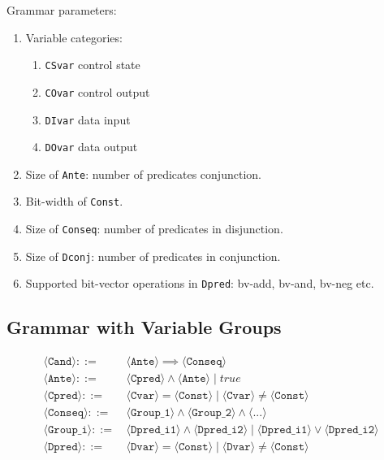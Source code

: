 \documentclass[10pt,conference]{article}
\numberwithin{equation}{section}
\newcommand{\tuple}[1]{\langle #1 \rangle}
\begin{document}
Grammar parameters:

\begin{enumerate}
\item Variable categories:
  \begin{enumerate}
    \item \texttt{CSvar} control state
    \item \texttt{COvar} control output
    \item \texttt{DIvar} data input
    \item \texttt{DOvar} data output
  \end{enumerate}
\item Size of \texttt{Ante}: number of predicates conjunction.
\item Bit-width of \texttt{Const}.
\item Size of \texttt{Conseq}: number of predicates in disjunction.
\item Size of \texttt{Dconj}: number of predicates in conjunction.
\item Supported bit-vector operations in \texttt{Dpred}: bv-add, bv-and, bv-neg etc.
\end{enumerate}



\subsection{Grammar with Variable Groups}

\begin{align}
\tuple{\texttt{Cand}} ::=\, & \tuple{\texttt{Ante}} \implies \tuple{\texttt{Conseq}} \\
\tuple{\texttt{Ante}} ::=\, & \tuple{\texttt{Cpred}} \land \tuple{\texttt{Ante}} \mid true\\
\tuple{\texttt{Cpred}} ::=\, & \tuple{\texttt{Cvar}} = \tuple{\texttt{Const}} \mid \tuple{\texttt{Cvar}} \neq \tuple{\texttt{Const}} \\
\tuple{\texttt{Conseq}} ::=\, & \tuple{\texttt{Group_1}}  \land \tuple{\texttt{Group_2}} \land \tuple{\texttt{...}} \\
\tuple{\texttt{Group_i}} ::=\, & \tuple{\texttt{Dpred_{i1}}} \land \tuple{\texttt{Dpred_{i2}}} \mid \tuple{\texttt{Dpred_{i1}}} \lor \tuple{\texttt{Dpred_{i2}}} \\
\tuple{\texttt{Dpred}} ::=\, & \tuple{\texttt{Dvar}} = \tuple{\texttt{Const}} \mid \tuple{\texttt{Dvar}} \neq \tuple{\texttt{Const}}
\end{align}
\end{document}
